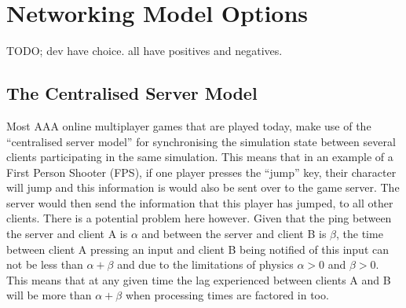 \newpage
\section{Networking Model Options}
TODO; dev have choice. all have positives and negatives.


\subsection{The Centralised Server Model}
Most AAA online multiplayer games that are played today, make use of the ``centralised server model'' for synchronising the simulation state between several clients participating in the same simulation. This means that in an example of a First Person Shooter (FPS), if one player presses the ``jump'' key, their character will jump and this information is would also be sent over to the game server. The server would then send the information that this player has jumped, to all other clients. There is a potential problem here however. Given that the ping between the server and client A is \(\alpha\) and between the server and client B is \(\beta\), the time between client A pressing an input and client B being notified of this input can not be less than $\alpha+\beta$ and due to the limitations of physics $\alpha>0$ and $\beta>0$. This means that at any given time the lag experienced between clients A and B will be more than $\alpha+\beta$ when processing times are factored in too.




